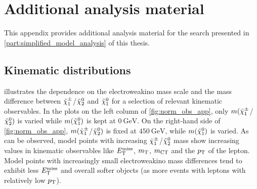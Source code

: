
\chapter{Additional analysis material}

\graphicspath{{chapter-analysis/Figs/}}

This appendix provides additional analysis material for the \onelepton search presented in \cref{part:simplified_model_analysis} of this thesis.

\section{Kinematic distributions}\label{app:kinematic_distributions}

 illustrates the dependence on the electroweakino mass scale and the mass difference between $\tilde{\chi}_1^\pm$/$\tilde{\chi}_2^0$ and $\tilde{\chi}_1^0$ for a selection of relevant kinematic observables. In the plots on the left column of \cref{fig:norm_obs_app}, only \mbox{$m(\tilde{\chi}_1^\pm$/$\tilde{\chi}_2^0)$} is varied while $m(\tilde{\chi}_1^0)$ is kept at $\SI{0}{\GeV}$. On the right-hand side of \cref{fig:norm_obs_app}, \mbox{$m(\tilde{\chi}_1^\pm$/$\tilde{\chi}_2^0)$} is fixed at $\SI{450}{\GeV}$, while $m(\tilde{\chi}_1^0)$ is varied. As can be observed, model points with increasing \mbox{$\tilde{\chi}_1^\pm$/$\tilde{\chi}_2^0$} mass show increasing values in kinematic observables like $E_{\textrm{T}}^{\textrm{miss}}$, $m_{\textrm{T}}$, $m_{\textrm{CT}}$ and the $p_{\mathrm{T}}$ of the lepton. Model points with increasingly small electroweakino mass differences tend to exhibit less $E_{\textrm{T}}^{\textrm{miss}}$ and overall softer objects (as \eg more events with leptons with relatively low $p_{\mathrm{T}}$).

